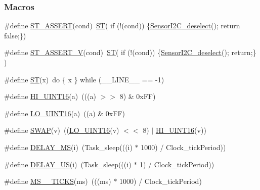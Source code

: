 \subsubsection*{Macros}
\begin{DoxyCompactItemize}
\item 
\#define \hyperlink{_sensor_util_8h_aa1d75393f5f60fc7fc58b9822c23f896}{S\+T\+\_\+\+A\+S\+S\+E\+R\+T}(cond)~\hyperlink{_sensor_util_8h_a83a7925bef8f2e5faffa99821f818f95}{S\+T}( if (!(cond)) \{\hyperlink{_sensor_i2_c_8h_a8e1291a81ac7875a040fda088682bb83}{Sensor\+I2\+C\+\_\+deselect}(); return false;\})
\item 
\#define \hyperlink{_sensor_util_8h_afa6d4d5f6e448eb007acfa739e9bf93e}{S\+T\+\_\+\+A\+S\+S\+E\+R\+T\+\_\+\+V}(cond)~\hyperlink{_sensor_util_8h_a83a7925bef8f2e5faffa99821f818f95}{S\+T}( if (!(cond)) \{\hyperlink{_sensor_i2_c_8h_a8e1291a81ac7875a040fda088682bb83}{Sensor\+I2\+C\+\_\+deselect}(); return;\} )
\item 
\#define \hyperlink{_sensor_util_8h_a83a7925bef8f2e5faffa99821f818f95}{S\+T}(x)~do \{ x \} while (\+\_\+\+\_\+\+L\+I\+N\+E\+\_\+\+\_\+ == -\/1)
\item 
\#define \hyperlink{_sensor_util_8h_a869398c9f0eb7bcf1c8e101b052eed07}{H\+I\+\_\+\+U\+I\+N\+T16}(a)~(((a) $>$$>$ 8) \& 0x\+F\+F)
\item 
\#define \hyperlink{_sensor_util_8h_ab2b94e11f455d94fd743666d4f1364d7}{L\+O\+\_\+\+U\+I\+N\+T16}(a)~((a) \& 0x\+F\+F)
\item 
\#define \hyperlink{_sensor_util_8h_a8bce92215fd97a1339c48fbe4c272ede}{S\+W\+A\+P}(v)~((\hyperlink{_sensor_util_8h_ab2b94e11f455d94fd743666d4f1364d7}{L\+O\+\_\+\+U\+I\+N\+T16}(v) $<$$<$ 8) $\vert$ \hyperlink{_sensor_util_8h_a869398c9f0eb7bcf1c8e101b052eed07}{H\+I\+\_\+\+U\+I\+N\+T16}(v))
\item 
\#define \hyperlink{_sensor_util_8h_ad1cc7765dc57ee760365c9ba5935a014}{D\+E\+L\+A\+Y\+\_\+\+M\+S}(i)~(Task\+\_\+sleep(((i) $\ast$ 1000) / Clock\+\_\+tick\+Period))
\item 
\#define \hyperlink{_sensor_util_8h_aa1676902b9d24e097ff1f255776c33bd}{D\+E\+L\+A\+Y\+\_\+\+U\+S}(i)~(Task\+\_\+sleep(((i) $\ast$ 1) / Clock\+\_\+tick\+Period))
\item 
\#define \hyperlink{_sensor_util_8h_ae32a07931ba4360a026656bdf77de13f}{M\+S\+\_\+\_\+\+T\+I\+C\+K\+S}(ms)~(((ms) $\ast$ 1000) / Clock\+\_\+tick\+Period)
\end{DoxyCompactItemize}
